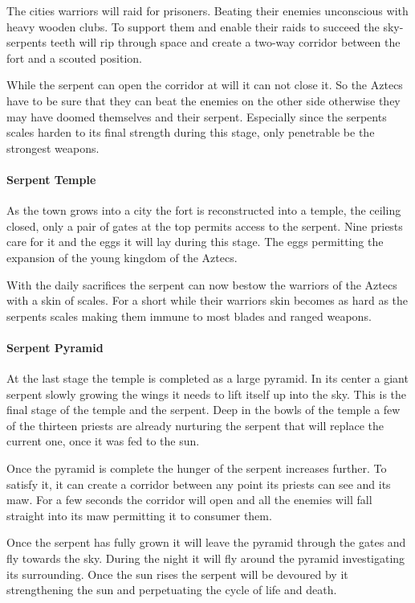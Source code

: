 \documentclass[a4paper]{book}
\begin{document}
The cities warriors will raid for prisoners. Beating their enemies unconscious
with heavy wooden clubs. To support them and enable their raids to succeed the
sky-serpents teeth will rip through space and create a two-way corridor between
the fort and a scouted position.

While the serpent can open the corridor at will it can not close it. So the
\gls{Aztecs} have to be sure that they can beat the enemies on the other side
otherwise they may have doomed themselves and their serpent. Especially since
the serpents scales harden to its final strength during this stage, only
penetrable be the strongest weapons.

\paragraph{Serpent Temple}
As the town grows into a city the fort is reconstructed into a temple, the
ceiling closed, only a pair of gates at the top permits access to the serpent.
Nine priests care for it and the eggs it will lay during this stage. The eggs
permitting the expansion of the young kingdom of the \gls{Aztecs}.

With the daily sacrifices the serpent can now bestow the warriors of the
\gls{Aztecs} with a skin of scales. For a short while their warriors skin
becomes as hard as the serpents scales making them immune to most blades and
ranged weapons.

\paragraph{Serpent Pyramid}
At the last stage the temple is completed as a large pyramid. In its center a
giant serpent slowly growing the wings it needs to lift itself up into the sky.
This is the final stage of the temple and the serpent. Deep in the bowls of the
temple a few of the thirteen priests are already nurturing the serpent that
will replace the current one, once it was fed to the sun.

Once the pyramid is complete the hunger of the serpent increases further. To
satisfy it, it can create a corridor between any point its priests can see and
its maw. For a few seconds the corridor will open and all the enemies will fall
straight into its maw permitting it to consumer them.

Once the serpent has fully grown it will leave the pyramid through the gates
and fly towards the sky. During the night it will fly around the pyramid
investigating its surrounding. Once the sun rises the serpent will be devoured
by it strengthening the sun and perpetuating the cycle of life and death.
\end{document}
